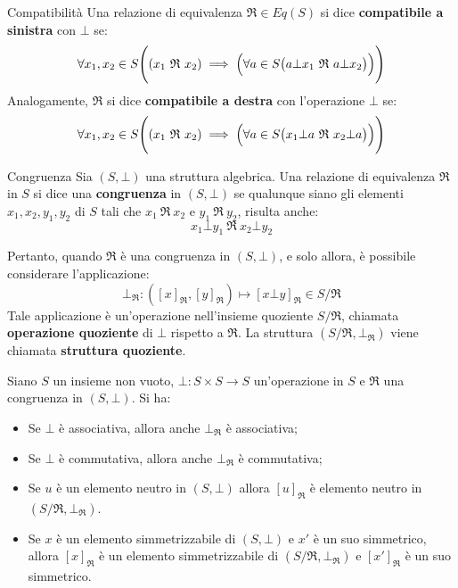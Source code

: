 \begin{defbox}{Compatibilità}
	Una relazione di equivalenza $\mathfrak{R} \in Eq(S)$ si dice \textbf{compatibile a sinistra} con $\bot$ se:
	\begin{displaymath}
		\forall x_{1},x_{2} \in S \Biggl((x_{1}\ \mathfrak{R} \ x_{2}) \implies \Bigl(\forall a \in S \bigl(a \bot x_{1} \ \mathfrak{R} \ a \bot x_{2}\bigr)\Bigr)\Biggr)
	\end{displaymath}
	Analogamente, $\mathfrak{R}$ si dice \textbf{compatibile a destra} con l'operazione $\bot$ se:
	\begin{displaymath}
		\forall x_{1},x_{2} \in S \Biggl((x_{1}\ \mathfrak{R} \ x_{2}) \implies \Bigl(\forall a \in S \bigl( x_{1} \bot a \ \mathfrak{R} \ x_{2} \bot a \bigr)\Bigr)\Biggr)
	\end{displaymath}
\end{defbox}

\begin{defbox}{Congruenza}
	Sia $(S,\bot)$ una struttura algebrica. Una relazione di equivalenza $\mathfrak{R}$ in $S$ si dice una \textbf{congruenza} in $(S,\bot)$ se qualunque siano gli elementi $x_{1},x_{2},y_{1},y_{2}$ di $S$ tali che $x_{1} \ \mathfrak{R} \ x_{2}$ e $y_{1} \ \mathfrak{R} \ y_{2}$, risulta anche:
	\begin{displaymath}
		x_{1} \bot y_{1} \ \mathfrak{R} \ x_{2} \bot y_{2}
	\end{displaymath}
\end{defbox}


Pertanto, quando $\mathfrak{R}$ è una congruenza in $(S,\bot)$, e solo allora, è possibile considerare l'applicazione:
\begin{displaymath}
	\bot_{\mathfrak{R}}: ([x]_{\mathfrak{R}},[y]_{\mathfrak{R}}) \mapsto [x \bot y]_{\mathfrak{R}} \in S/{\mathfrak{R}}
\end{displaymath}
Tale applicazione è un'operazione nell'insieme quoziente $S/{\mathfrak{R}}$, chiamata \textbf{operazione quoziente} di $\bot$ rispetto a $\mathfrak{R}$. La struttura $(S/{\mathfrak{R}}, \bot_{\mathfrak{R}})$ viene chiamata \textbf{struttura quoziente}.


\begin{propbox}\label{prop:operazione_quoziente}
	Siano $S$ un insieme non vuoto, $\bot: S \times S \rightarrow S$ un'operazione in $S$ e $\mathfrak{R}$ una congruenza in $(S,\bot)$. Si ha:
	\begin{itemize}
		\item Se $\bot$ è associativa, allora anche $\bot_{\mathfrak{R}}$ è associativa;
		\item Se $\bot$ è commutativa, allora anche $\bot_{\mathfrak{R}}$ è commutativa;
		\item Se $u$ è un elemento neutro in $(S,\bot)$ allora $[u]_{\mathfrak{R}}$ è elemento neutro in $(S/{\mathfrak{R}},\bot_{\mathfrak{R}})$.
		\item Se $x$ è un elemento simmetrizzabile di $(S,\bot)$ e $x'$ è un suo simmetrico, allora $[x]_{\mathfrak{R}}$ è un elemento simmetrizzabile di $(S/{\mathfrak{R}},\bot_{\mathfrak{R}})$ e $[x']_{\mathfrak{R}}$ è un suo simmetrico.
	\end{itemize}
\end{propbox}

